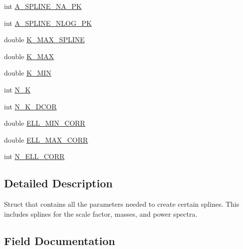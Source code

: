 \begin{DoxyCompactItemize}
\item 
int \mbox{\hyperlink{structccl__spline__params_a1e8edb8505e8a05d62df4d92999dacfc}{A\+\_\+\+S\+P\+L\+I\+N\+E\+\_\+\+N\+A\+\_\+\+PK}}
\item 
int \mbox{\hyperlink{structccl__spline__params_afebd711662e73360a7b18968ac5e8f40}{A\+\_\+\+S\+P\+L\+I\+N\+E\+\_\+\+N\+L\+O\+G\+\_\+\+PK}}
\item 
double \mbox{\hyperlink{structccl__spline__params_a2d964b09cc43201bee6c11e3b54aa26a}{K\+\_\+\+M\+A\+X\+\_\+\+S\+P\+L\+I\+NE}}
\item 
double \mbox{\hyperlink{structccl__spline__params_ab4952ddcd26e8645d5196db737650dfb}{K\+\_\+\+M\+AX}}
\item 
double \mbox{\hyperlink{structccl__spline__params_a69fe54941947403eb626f996ff941d73}{K\+\_\+\+M\+IN}}
\item 
int \mbox{\hyperlink{structccl__spline__params_aaded1b8452c591250ef44051fa8681a8}{N\+\_\+K}}
\item 
int \mbox{\hyperlink{structccl__spline__params_a68330cc26e66cb4eca93aca832ee6366}{N\+\_\+\+K\+\_\+D\+C\+OR}}
\item 
double \mbox{\hyperlink{structccl__spline__params_ab5be4e564bbd28fc51ffcbb0797957d5}{E\+L\+L\+\_\+\+M\+I\+N\+\_\+\+C\+O\+RR}}
\item 
double \mbox{\hyperlink{structccl__spline__params_a3407f2c11713c908ee9e5b6d8c36a1ac}{E\+L\+L\+\_\+\+M\+A\+X\+\_\+\+C\+O\+RR}}
\item 
int \mbox{\hyperlink{structccl__spline__params_ae38764273f047b530ffbc5ccb1935428}{N\+\_\+\+E\+L\+L\+\_\+\+C\+O\+RR}}
\end{DoxyCompactItemize}


\subsection{Detailed Description}
Struct that contains all the parameters needed to create certain splines. This includes splines for the scale factor, masses, and power spectra. 

\subsection{Field Documentation}
\mbox{\label{structccl__spline__params_aa227bbd087fee06f845b9de60ff09556}} 
